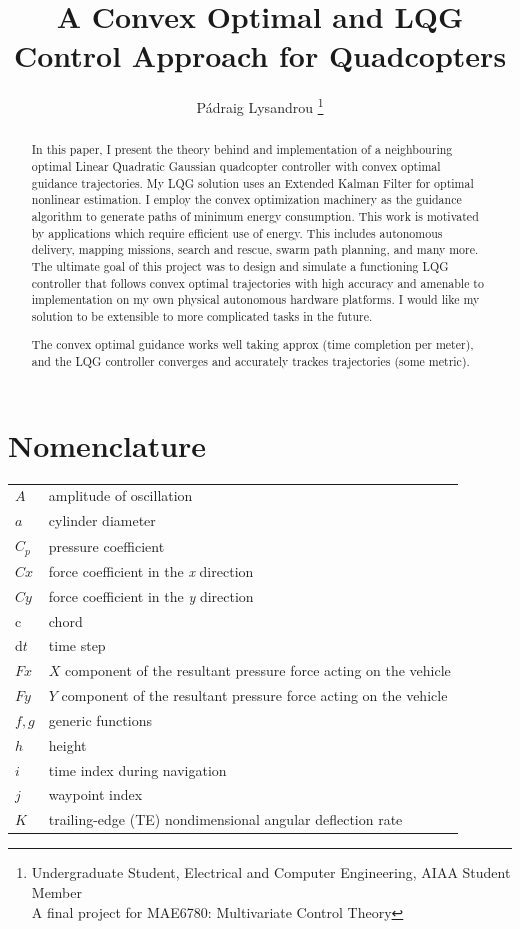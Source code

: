 \documentclass[conf]{new-aiaa}
\title{A Convex Optimal and LQG Control Approach for Quadcopters}
\author{ Pádraig Lysandrou
\footnote{Undergraduate Student, Electrical and Computer Engineering, AIAA Student Member \\ A final project for MAE6780: Multivariate Control Theory}}
\affil{Cornell University, Ithaca, New York, 14853}
\begin{document}
\maketitle

\begin{abstract}
In this paper, I present the theory behind and implementation of a neighbouring optimal Linear Quadratic Gaussian quadcopter controller with convex optimal guidance trajectories. My LQG solution uses an Extended Kalman Filter for optimal nonlinear estimation. I employ the convex optimization machinery as the guidance algorithm to generate paths of minimum energy consumption. This work is motivated by applications which require efficient use of energy. This includes autonomous delivery, mapping missions, search and rescue, swarm path planning, and many more. The ultimate goal of this project was to design and simulate a functioning LQG controller that follows convex optimal trajectories with high accuracy and amenable to implementation on my own physical autonomous hardware platforms. I would like my solution to be extensible to more complicated tasks in the future.

 The convex optimal guidance works well taking approx (time completion per meter), and the LQG controller converges and accurately trackes trajectories (some metric).
\end{abstract}

\section*{Nomenclature}

{\renewcommand\arraystretch{1.0}
\noindent\begin{longtable*}{@{}l @{\quad=\quad} l@{}}
$A$  & amplitude of oscillation \\
$a$ &    cylinder diameter \\
$C_p$& pressure coefficient \\
$Cx$ & force coefficient in the \textit{x} direction \\
$Cy$ & force coefficient in the \textit{y} direction \\
c   & chord \\
d$t$ & time step \\
$Fx$ & $X$ component of the resultant pressure force acting on the vehicle \\
$Fy$ & $Y$ component of the resultant pressure force acting on the vehicle \\
$f, g$   & generic functions \\
$h$  & height \\
$i$  & time index during navigation \\
$j$  & waypoint index \\
$K$  & trailing-edge (TE) nondimensional angular deflection rate
\end{longtable*}}
\end{document}
